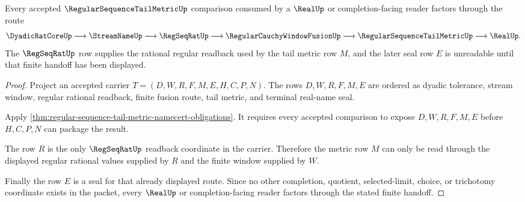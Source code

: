 \begin{theorem}\label{thm:regular-sequence-tail-metric-regseqrat-handoff}
Every accepted $\RegularSequenceTailMetricUp$ comparison consumed by a $\RealUp$ or completion-facing reader factors through the route
$$
\DyadicRatCoreUp \longrightarrow \StreamNameUp \longrightarrow \RegSeqRatUp \longrightarrow \RegularCauchyWindowFusionUp \longrightarrow \RegularSequenceTailMetricUp \longrightarrow \RealUp .
$$
The $\RegSeqRatUp$ row supplies the rational regular readback used by the tail metric row $M$, and the later seal row $E$ is unreadable until that finite handoff has been displayed.
\end{theorem}
\begin{proof}
Project an accepted carrier $T=(D,W,R,F,M,E,H,C,P,N)$. The rows $D,W,R,F,M,E$ are ordered as dyadic tolerance, stream window, regular rational readback, finite fusion route, tail metric, and terminal real-name seal.

Apply \autoref{thm:regular-sequence-tail-metric-namecert-obligations}. It requires every accepted comparison to expose $D,W,R,F,M,E$ before $H,C,P,N$ can package the result.

The row $R$ is the only $\RegSeqRatUp$ readback coordinate in the carrier. Therefore the metric row $M$ can only be read through the displayed regular rational values supplied by $R$ and the finite window supplied by $W$.

Finally the row $E$ is a seal for that already displayed route. Since no other completion, quotient, selected-limit, choice, or trichotomy coordinate exists in the packet, every $\RealUp$ or completion-facing reader factors through the stated finite handoff.
\end{proof}




